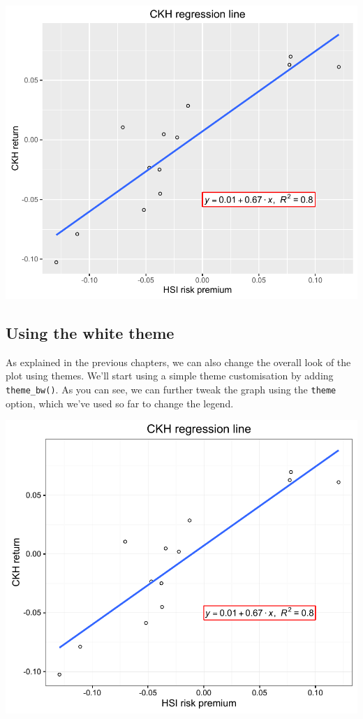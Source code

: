\begin{center}\includegraphics[width=0.6\linewidth]{11_Linear_Regression_Plot_pdf/lr_13-1} \end{center}

\subsection{Using the white theme}\label{using-the-white-theme}

As explained in the previous chapters, we can also change the overall look
of the plot using themes. We'll start using a simple theme customisation
by adding \texttt{theme\_bw()}. As you can see, we can further tweak the
graph using the \texttt{theme} option, which we've used so far to change
the legend.

\begin{Shaded}
\begin{Highlighting}[]
\StringTok{ }\StringTok{ }\NormalTok{()}
\end{Highlighting}
\end{Shaded}

\begin{center}\includegraphics[width=0.6\linewidth]{11_Linear_Regression_Plot_pdf/lr_14-1} \end{center}

